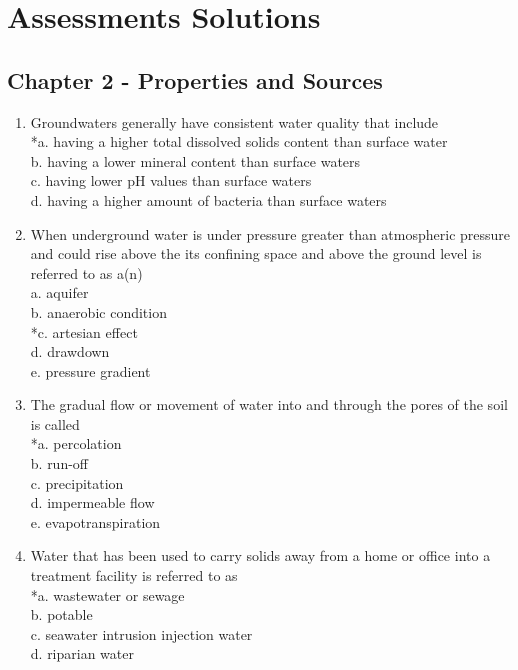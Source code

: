 
\chapter{Assessments Solutions}
\section{Chapter 2 - Properties and Sources}
\begin{enumerate}[1.]
\item Groundwaters generally have consistent water quality that include\\
*a. having a higher total dissolved solids content than surface water\\
b. having a lower mineral content than surface waters\\
c. having lower $\mathrm{pH}$ values than surface waters\\
d. having a higher amount of bacteria than surface waters\\
\item When underground water is under pressure greater than atmospheric pressure and could rise above the its confining space and above the ground level is referred to as a(n)\\
a. aquifer\\
b. anaerobic condition\\
*c. artesian effect\\
d. drawdown\\
e. pressure gradient\\
\item The gradual flow or movement of water into and through the pores of the soil is called\\
*a. percolation\\
b. run-off\\
c. precipitation\\
d. impermeable flow\\
e. evapotranspiration\\
\item Water that has been used to carry solids away from a home or office into a treatment facility is referred to as\\
*a. wastewater or sewage\\
b. potable\\
c. seawater intrusion injection water\\
d. riparian water\\

\end{enumerate}

